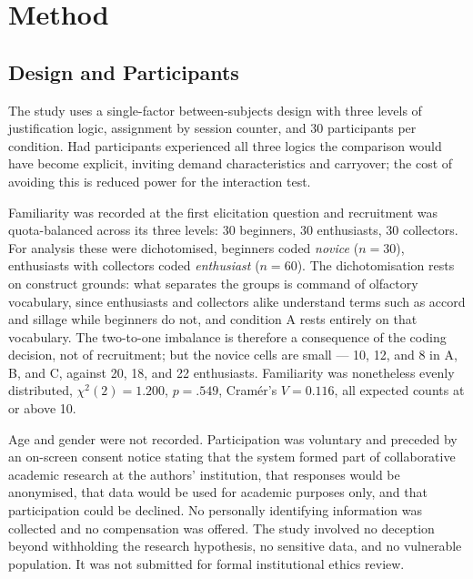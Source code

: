 \documentclass[conference]{IEEEtran}
\begin{document}
\section{Method}
\label{sec:method}

\subsection{Design and Participants}

The study uses a single-factor between-subjects design with three levels of justification
logic, assignment by session counter, and 30 participants per condition. Had participants
experienced all three logics the comparison would have become explicit, inviting demand
characteristics and carryover; the cost of avoiding this is reduced power for the
interaction test.

Familiarity was recorded at the first elicitation question and recruitment was
quota-balanced across its three levels: 30 beginners, 30 enthusiasts, 30 collectors. For
analysis these were dichotomised, beginners coded \textit{novice} ($n = 30$), enthusiasts
with collectors coded \textit{enthusiast} ($n = 60$). The dichotomisation rests on construct
grounds: what separates the groups is command of olfactory vocabulary, since enthusiasts
and collectors alike understand terms such as accord and sillage while beginners do not,
and condition A rests entirely on that vocabulary. The two-to-one imbalance is therefore a
consequence of the coding decision, not of recruitment; but the novice cells are small ---
10, 12, and 8 in A, B, and C, against 20, 18, and 22 enthusiasts. Familiarity was
nonetheless evenly distributed, $\chi^{2}(2) = 1.200$, $p = .549$, Cram\'{e}r's
$V = 0.116$, all expected counts at or above 10.

Age and gender were not recorded. Participation was voluntary and preceded by an on-screen
consent notice stating that the system formed part of collaborative academic research at
the authors' institution, that responses would be anonymised, that data would be used for
academic purposes only, and that participation could be declined. No personally identifying
information was collected and no compensation was offered. The study involved no deception
beyond withholding the research hypothesis, no sensitive data, and no vulnerable
population. It was not submitted for formal institutional ethics review.
\end{document}
